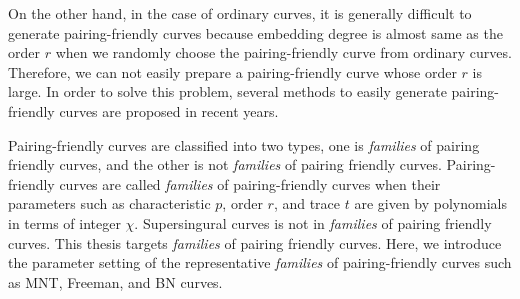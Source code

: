 On the other hand, in the case of ordinary curves, it is generally difficult to generate pairing-friendly curves because embedding degree is almost same as the order $r$ when we randomly choose the pairing-friendly curve from ordinary curves.
Therefore, we can not easily prepare a pairing-friendly curve whose order $r$ is large.
In order to solve this problem, several methods to easily generate pairing-friendly curves are proposed in recent years\cite{JC:FreScoTes10}.

Pairing-friendly curves are classified into two types, one is {\it families} of pairing friendly curves, and the other is not {\it families} of pairing friendly curves.
Pairing-friendly curves are called {\it families} of pairing-friendly curves when their parameters such as characteristic $p$, order $r$, and trace $t$ are given by polynomials in terms of integer $\chi$.
Supersingural curves is not in {\it families} of pairing friendly curves.
This thesis targets {\it families} of pairing friendly curves.
Here, we introduce the parameter setting of the representative {\it families} of pairing-friendly curves such as MNT\cite{MNT}, Freeman\cite{FreemanPDF}, and BN curves\cite{SAC:BarNae05}.



